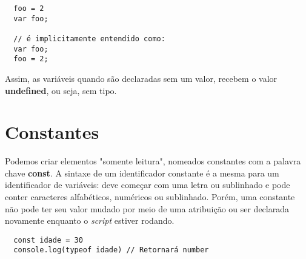 \begin{lstlisting}
  foo = 2
  var foo;

  // é implicitamente entendido como:
  var foo;
  foo = 2;
\end{lstlisting}

Assim, as variáveis quando são declaradas sem um valor, recebem o valor \textbf
{undefined}, ou seja, sem tipo.

\section{Constantes}

Podemos criar elementos "somente leitura", nomeados constantes com a palavra 
chave \textbf{const}. A sintaxe de um identificador constante é a mesma para um 
identificador de variáveis: deve começar com uma letra ou sublinhado e pode 
conter caracteres alfabéticos, numéricos ou sublinhado. Porém, uma constante 
não pode ter seu valor mudado por meio de uma atribuição ou ser declarada 
novamente enquanto o \textit{script} estiver rodando.

\begin{lstlisting}
  const idade = 30
  console.log(typeof idade) // Retornará number
\end{lstlisting}